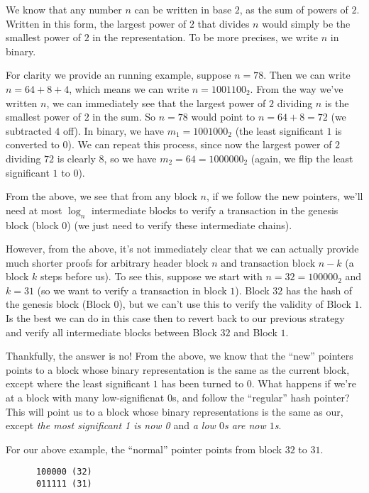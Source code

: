 \documentclass[12pt]{exam}
\begin{document}
\begin{questions}
\begin{solution}
\begin{enumerate}[label=\textbf{\alph*.}]
    We know that any number $n$ can be written in base $2$, as the sum of powers of $2$. Written in this form, the largest power of $2$ that divides $n$ would simply be the smallest power of $2$ in the representation. To be more precises, we write $n$ in binary.

    For clarity we provide an running example, suppose $n = 78$. Then we can write $n = 64 + 8 + 4$, which means we can write $n = 1001100_2$. From the way we've written $n$, we can immediately see that the largest power of $2$ dividing $n$ is the smallest power of $2$ in the sum. So $n = 78$ would point to $n = 64 + 8 = 72$ (we subtracted $4$ off). In binary, we have $m_1 = 1001000_2$ (the least significant $1$ is converted to $0$). We can repeat this process, since now the largest power of $2$ dividing $72$ is clearly $8$, so we have $m_2 = 64 = 1000000_2$ (again, we flip the least significant $1$ to $0$).

    From the above, we see that from any block $n$, if we follow the new pointers, we'll need at most $\log_n$ intermediate blocks to verify a transaction in the genesis block (block $0$) (we just need to verify these intermediate chains).

    However, from the above, it's not immediately clear that we can actually provide much shorter proofs for arbitrary header block $n$ and transaction block $n - k$ (a block $k$ steps before us). To see this, suppose we start with $n = 32 = 100000_2$ and $k = 31$ (so we want to verify a transaction in block $1$). Block $32$ has the hash of the genesis block (Block $0$), but we can't use this to verify the validity of Block $1$. Is the best we can do in this case then to revert back to our previous strategy and verify all intermediate blocks between Block $32$ and Block $1$.


    Thankfully, the answer is no! From the above, we know that the ``new'' pointers points to a block whose binary representation is the same as the current block, except where the least significant $1$ has been turned to $0$. What happens if we're at a block with many low-significnat $0$s, and follow the ``regular'' hash pointer? This will point us to a block whose binary representations is the same as our, except \textit{the most significant 1 is now 0} and \textit{a low $0$s are now $1$s}.

    For our above example, the ``normal'' pointer points from block $32$ to $31$.
    \begin{verbatim}
      100000 (32)
      011111 (31)
    \end{verbatim}


\end{enumerate}
\end{solution}
\end{questions}
\end{document}
